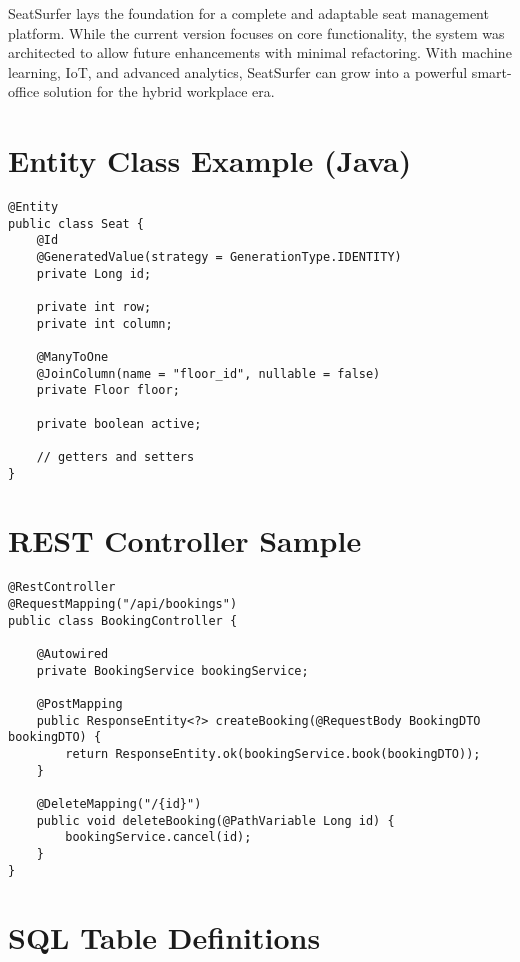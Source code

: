 \documentclass[12pt,a4paper]{report}
\begin{document}
SeatSurfer lays the foundation for a complete and adaptable seat management platform. While the current version focuses on core functionality, the system was architected to allow future enhancements with minimal refactoring. With machine learning, IoT, and advanced analytics, SeatSurfer can grow into a powerful smart-office solution for the hybrid workplace era.

\newpage

\appendix

\chapter{Entity Class Example (Java)}
\label{appendix:entity}

\begin{lstlisting}[caption=Seat Entity (Java), label=lst:seat-entity]
@Entity
public class Seat {
    @Id
    @GeneratedValue(strategy = GenerationType.IDENTITY)
    private Long id;

    private int row;
    private int column;

    @ManyToOne
    @JoinColumn(name = "floor_id", nullable = false)
    private Floor floor;

    private boolean active;

    // getters and setters
}
\end{lstlisting}

\chapter{REST Controller Sample}
\label{appendix:controller}

\begin{lstlisting}[caption=Booking Controller (Java), label=lst:booking-controller]
@RestController
@RequestMapping("/api/bookings")
public class BookingController {

    @Autowired
    private BookingService bookingService;

    @PostMapping
    public ResponseEntity<?> createBooking(@RequestBody BookingDTO bookingDTO) {
        return ResponseEntity.ok(bookingService.book(bookingDTO));
    }

    @DeleteMapping("/{id}")
    public void deleteBooking(@PathVariable Long id) {
        bookingService.cancel(id);
    }
}
\end{lstlisting}

\chapter{SQL Table Definitions}
\label{appendix:sql}
\end{document}
